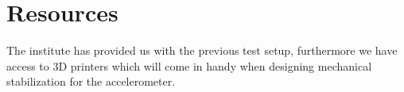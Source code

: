 \section*{Resources} 

The institute has provided us with the previous test setup, furthermore we have access to 3D printers which will come in handy when designing mechanical stabilization for the accelerometer.